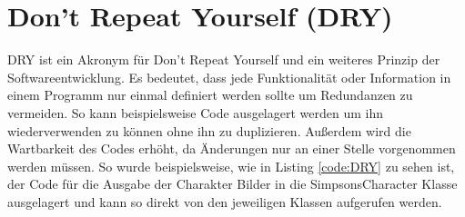 \section{Don't Repeat Yourself (DRY)}
DRY ist ein Akronym für Don't Repeat Yourself und ein weiteres Prinzip der Softwareentwicklung. Es bedeutet, dass jede Funktionalität oder Information in einem Programm nur einmal definiert werden sollte um Redundanzen zu vermeiden. So kann beispielsweise Code ausgelagert werden um ihn wiederverwenden zu können ohne ihn zu duplizieren. Außerdem wird die Wartbarkeit des Codes erhöht, da Änderungen nur an einer Stelle vorgenommen werden müssen. So wurde beispielsweise, wie in Listing \ref{code:DRY} zu sehen ist, der Code für die Ausgabe der Charakter Bilder in die SimpsonsCharacter Klasse ausgelagert und kann so direkt von den jeweiligen Klassen aufgerufen werden.
